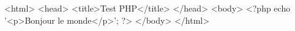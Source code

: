<html>
    <head>
        <title>Test PHP</title>
        </head>
    <body>
    <?php echo '<p>Bonjour le monde</p>'; ?>
    </body>
</html>